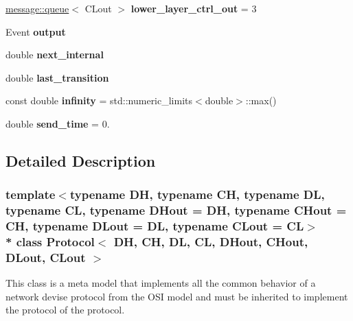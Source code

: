 \begin{DoxyCompactItemize}
\item 
\hyperlink{classmessage_1_1queue}{message\+::queue}$<$ C\+Lout $>$ {\bfseries lower\+\_\+layer\+\_\+ctrl\+\_\+out} = 3\hypertarget{classProtocol_afb1ff2eed1cb8b7380a764eab983b53b}{}\label{classProtocol_afb1ff2eed1cb8b7380a764eab983b53b}

\item 
Event {\bfseries output}\hypertarget{classProtocol_ab8656119955fe33f2f79a8098f77fa2e}{}\label{classProtocol_ab8656119955fe33f2f79a8098f77fa2e}

\item 
double {\bfseries next\+\_\+internal}\hypertarget{classProtocol_a371e159421cd779235858dbaf46e4a96}{}\label{classProtocol_a371e159421cd779235858dbaf46e4a96}

\item 
double {\bfseries last\+\_\+transition}\hypertarget{classProtocol_af1a9659d57ed7f5fb155a8ce71db4fbb}{}\label{classProtocol_af1a9659d57ed7f5fb155a8ce71db4fbb}

\item 
const double {\bfseries infinity} = std\+::numeric\+\_\+limits$<$double$>$\+::max()\hypertarget{classProtocol_a4eedc325cc4b0b5f00306fb0a3553c4a}{}\label{classProtocol_a4eedc325cc4b0b5f00306fb0a3553c4a}

\item 
double {\bfseries send\+\_\+time} = 0.\hypertarget{classProtocol_a3f845ba4fa780e15a89858ff908fbb1f}{}\label{classProtocol_a3f845ba4fa780e15a89858ff908fbb1f}

\end{DoxyCompactItemize}


\subsection{Detailed Description}
\subsubsection*{template$<$typename DH, typename CH, typename DL, typename CL, typename D\+Hout = DH, typename C\+Hout = CH, typename D\+Lout = DL, typename C\+Lout = CL$>$\\*
class Protocol$<$ D\+H, C\+H, D\+L, C\+L, D\+Hout, C\+Hout, D\+Lout, C\+Lout $>$}

This class is a meta model that implements all the common behavior of a network devise protocol from the O\+SI model and must be inherited to implement the protocol of the protocol. 

